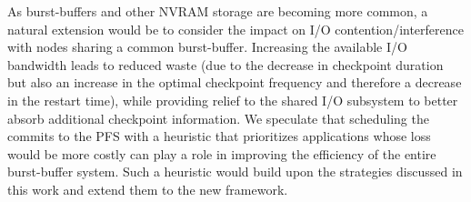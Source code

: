 As burst-buffers and other NVRAM storage are becoming more common, a natural
extension would be to consider the impact on I/O contention/interference with
nodes sharing a common burst-buffer. Increasing the available I/O bandwidth
leads to reduced  waste (due to the decrease in checkpoint duration but also
an increase in the optimal checkpoint frequency and therefore a decrease in the
restart time), while providing relief to the shared I/O subsystem to better
absorb additional checkpoint information. We speculate that scheduling the
commits to the PFS with a heuristic that prioritizes applications whose loss
would be more costly can play a role in improving the efficiency of the entire
burst-buffer system. Such a heuristic would build upon the strategies discussed in this work and
extend them to the new framework. 

